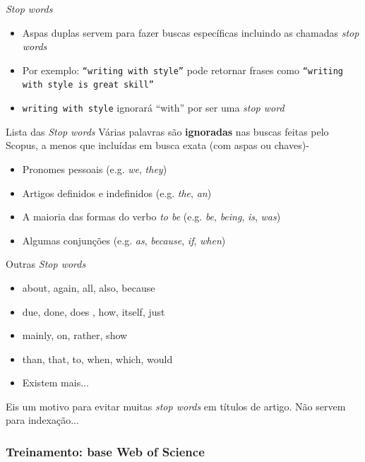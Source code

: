 \begin{frame}{\emph{Stop words}} 
\begin{itemize}
\item Aspas duplas servem para fazer buscas específicas incluindo as chamadas \emph{stop words}
\item Por exemplo: \texttt{``writing with style''} pode retornar frases como \texttt{``writing with style is great skill''} 
\item \texttt{writing with style} ignorará ``with'' por ser uma \emph{stop word}
\end{itemize}
\end{frame}

\begin{frame}{Lista das \emph{Stop words}} 
Várias palavras são \textbf{ignoradas} nas buscas feitas pelo Scopus, a menos que incluídas em busca exata (com aspas ou chaves)-
\begin{itemize}
\item Pronomes pessoais (e.g. \emph{we}, \emph{they})
\item Artigos definidos e indefinidos (e.g. \emph{the}, \emph{an})
\item A maioria das formas do verbo \textit{to be} (e.g. \emph{be}, \emph{being}, \emph{is}, \emph{was})
\item Algumas conjunções (e.g. \emph{as}, \emph{because}, \emph{if}, \emph{when})
\end{itemize}
\end{frame}

\begin{frame}{Outras \emph{Stop words}} 
\begin{itemize}
\item about, again, all, also, because
\item due, done, does , how, itself, just
\item mainly, on, rather, show 
\item than, that, to, when, which, would
\item Existem mais... 
\end{itemize}

Eis um motivo para evitar muitas \emph{stop words} em títulos de artigo. Não servem para indexação...
\end{frame}

\subsubsection{Treinamento: base Web of Science}

